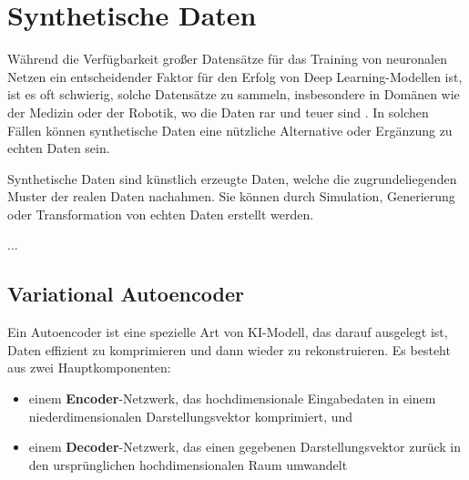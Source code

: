 
\section{Synthetische Daten} \label{sec-synt-data}





Während die Verfügbarkeit großer Datensätze für das Training von neuronalen Netzen ein entscheidender Faktor für den Erfolg von Deep Learning-Modellen ist, ist es oft schwierig, solche Datensätze zu sammeln, insbesondere in Domänen wie der Medizin oder der Robotik, wo die Daten rar und teuer sind \cite{}. In solchen Fällen können synthetische Daten eine nützliche Alternative oder Ergänzung zu echten Daten sein.

Synthetische Daten sind künstlich erzeugte Daten, welche die zugrundeliegenden Muster der realen Daten nachahmen. Sie können durch Simulation, Generierung oder Transformation von echten Daten erstellt werden.

...

\subsection{Variational Autoencoder} \label{subsec-vae}

Ein Autoencoder ist eine spezielle Art von KI-Modell, das darauf ausgelegt ist, Daten effizient zu komprimieren und dann wieder zu rekonstruieren. Es besteht aus zwei Hauptkomponenten: \parencite{Foster2020}

\begin{itemize}
	\item einem \textbf{Encoder}-Netzwerk, das hochdimensionale Eingabedaten in einem niederdimensionalen Darstellungsvektor komprimiert, und
	\item einem \textbf{Decoder}-Netzwerk, das einen gegebenen Darstellungsvektor zurück in den ursprünglichen hochdimensionalen Raum umwandelt
\end{itemize}

